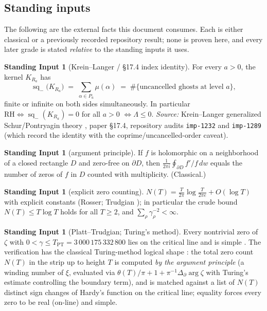 \documentclass[11pt]{article}
\theoremstyle{definition}
\newtheorem{standing}[theorem]{Standing Input}
\theoremstyle{remark}
\newcommand{\sq}{\operatorname{sq}_{-}}
\newcommand{\TPT}{T_{\mathrm{PT}}}
\begin{document}
\subsection{Standing inputs}

The following are the external facts this document consumes. Each is either
classical or a previously recorded repository result; none is proven here, and
every later grade is stated \emph{relative} to the standing inputs it uses.

\begin{standing}[Krein--Langer / \S17.4 index identity]\label{si:kl}
For every $a>0$, the kernel $K_{R_a}$ has
\[
\sq\bigl(K_{R_a}\bigr)\;=\;\sum_{\alpha\in P_a}\mu(\alpha)
\;=\;\#\{\text{uncancelled ghosts at level }a\},
\]
finite or infinite on both sides simultaneously. In particular
$\mathrm{RH}\iff \sq(K_{R_a})=0$ for all $a>0$ $\iff \Lambda\le0$.
\emph{Source:} Krein--Langer generalized Schur/Pontryagin theory
\cite{KreinLanger}, paper \S17.4, repository audits \texttt{imp-1232} and
\texttt{imp-1289} (which record the identity with the coprime/uncancelled-order
caveat).
\end{standing}

\begin{standing}[argument principle]\label{si:ap}
If $f$ is holomorphic on a neighborhood of a closed rectangle $D$ and
zero-free on $\partial D$, then
$\frac{1}{2\pi i}\oint_{\partial D} f'/f\,dw$ equals the number of zeros of
$f$ in $D$ counted with multiplicity. (Classical.)
\end{standing}

\begin{standing}[explicit zero counting]\label{si:rvm}
$N(T)=\frac{T}{2\pi}\log\frac{T}{2\pi e}+O(\log T)$ with explicit constants
(Rosser; Trudgian \cite{Trudgian}); in particular the crude bound
$N(T)\le T\log T$ holds for all $T\ge2$, and
$\sum_{\rho}\gamma_\rho^{-2}<\infty$.
\end{standing}

\begin{standing}[Platt--Trudgian; Turing's method]\label{si:pt}
Every nontrivial zero of $\zeta$ with $0<\gamma\le\TPT=3\,000\,175\,332\,800$
lies on the critical line and is simple \cite{PlattTrudgian}. The verification
has the classical Turing-method logical shape \cite{Turing,Booker}: the total
zero count $N(T)$ in the strip up to height $T$ is computed \emph{by the
argument principle} (a winding number of $\xi$, evaluated via
$\theta(T)/\pi+1+\pi^{-1}\Delta_{\partial}\arg\zeta$ with Turing's estimate
controlling the boundary term), and is matched against a list of $N(T)$
distinct sign changes of Hardy's function on the critical line; equality
forces every zero to be real (on-line) and simple.
\end{standing}
\end{document}
